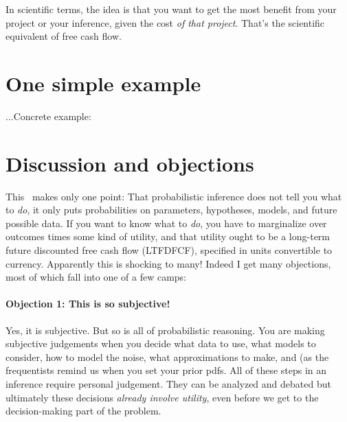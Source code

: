 \documentclass[12pt,twoside,pdftex]{article}
\begin{document}
In scientific terms, the idea is that you want to get the most benefit
from your project or your inference, given the cost \emph{of that
  project}.  That's the scientific equivalent of free cash flow.

\section{One simple example}

...Concrete example: 

\section{Discussion and objections}

This \documentname\ makes only one point: That probabilistic inference
does not tell you what to \emph{do}, it only puts probabilities on
parameters, hypotheses, models, and future possible data.  If you want
to know what to \emph{do}, you have to marginalize over outcomes times
some kind of utility, and that utility ought to be a long-term future
discounted free cash flow (LTFDFCF), specified in units convertible to
currency.  Apparently this is shocking to many!  Indeed I get many
objections, most of which fall into one of a few camps:

\paragraph{Objection 1: This is so subjective!}
Yes, it is subjective.  But so is all of probabilistic reasoning.  You
are making subjective judgements when you decide what data to use,
what models to consider, how to model the noise, what approximations
to make, and (as the frequentists remind us when you set your prior pdfs.  All of these steps in an
inference require personal judgement.  They can be analyzed and
debated but ultimately these decisions \emph{already involve utility},
even before we get to the decision-making part of the problem.
\end{document}
